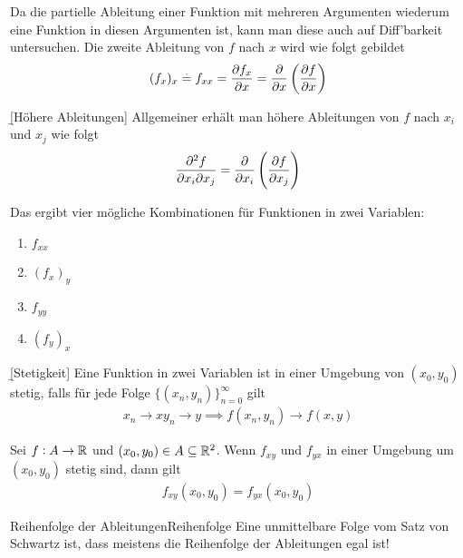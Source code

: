 \documentclass[12pt]{article}
\begin{document}
Da die partielle Ableitung einer Funktion mit mehreren Argumenten wiederum eine
Funktion in diesen Argumenten ist, kann man diese auch auf Diff'barkeit
untersuchen. Die zweite Ableitung von $f$ nach $x$ wird wie folgt gebildet
\begin{align}
        (f_{x})_x\overset{.}{=} f_{xx}=\pdv{f_x}{x}=\frac{\partial}{\partial x}\left(\pdv{f}{x}\right)
\end{align}

\begin{defn}{\b{[Höhere Ableitungen]}}
        Allgemeiner erhält man höhere Ableitungen von $f$ nach $x_i$ und $x_j$ wie folgt
        \begin{align}
                \frac{\partial^2 f}{\partial x_i\partial x_j}=\frac{\partial}{\partial x_i}\left(\pdv{f}{x_j}\right)
        \end{align}

        Das ergibt vier mögliche Kombinationen für Funktionen in zwei Variablen:
        \begin{enumerate}[topsep=0pt,itemsep=0.15em]
                \item $f_{xx}$
                \item $(f_{x})_y$
                \item $f_{yy}$
                \item $(f_y)_x$
        \end{enumerate}
\end{defn}

\begin{defn}{\b{[Stetigkeit]}}
        Eine Funktion in zwei Variablen ist in einer Umgebung von $(x_0,y_0)$ stetig, falls für jede Folge $\{(x_n,y_n)\}_{n=0}^{\infty}$ gilt
        \begin{align}
                x_n\to x y_n\to y \implies f(x_n,y_n)\to f(x,y)
        \end{align}
\end{defn}

\begin{thmb}{\emph{}}
        Sei $f:A\to\mathbb{R}$ und $(x_0,y_0)\in A\subseteq\mathbb{R}^2$. Wenn $f_{xy}$ und $f_{yx}$ in einer Umgebung um $(x_0,y_0)$ stetig sind, dann gilt
        \begin{align}
                f_{xy}(x_0,y_0)=f_{yx}(x_0,y_0)
        \end{align}
\end{thmb}

\begin{rmk}{Reihenfolge der Ableitungen}{Reihenfolge}
        Eine unmittelbare Folge vom Satz von Schwartz ist, dass meistens die Reihenfolge der Ableitungen egal ist!
\end{rmk}
\end{document}
